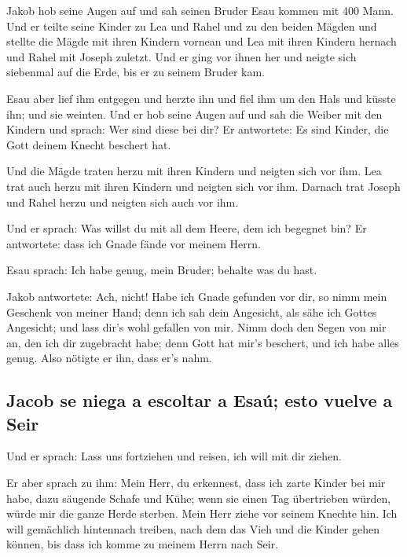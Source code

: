  Jakob hob seine Augen auf und sah seinen Bruder Esau
kommen mit 400 Mann. Und er teilte seine Kinder zu Lea und Rahel und zu
den beiden Mägden  und stellte die Mägde mit ihren Kindern
vornean und Lea mit ihren Kindern hernach und Rahel mit Joseph zuletzt.
 Und er ging vor ihnen her und neigte sich siebenmal auf
die Erde, bis er zu seinem Bruder kam.

 Esau aber lief ihm entgegen und herzte ihn und fiel ihm
um den Hals und küsste ihn; und sie weinten.  Und er hob
seine Augen auf und sah die Weiber mit den Kindern und sprach: Wer sind
diese bei dir? Er antwortete: Es sind Kinder, die Gott deinem Knecht
beschert hat.

 Und die Mägde traten herzu mit ihren Kindern und neigten
sich vor ihm.  Lea trat auch herzu mit ihren Kindern und
neigten sich vor ihm. Darnach trat Joseph und Rahel herzu und neigten
sich auch vor ihm.

 Und er sprach: Was willst du mit all dem Heere, dem ich
begegnet bin? Er antwortete: dass ich Gnade fände vor meinem Herrn.

 Esau sprach: Ich habe genug, mein Bruder; behalte was du
hast.

 Jakob antwortete: Ach, nicht! Habe ich Gnade gefunden
vor dir, so nimm mein Geschenk von meiner Hand; denn ich sah dein
Angesicht, als sähe ich Gottes Angesicht; und lass dir's wohl gefallen
von mir.  Nimm doch den Segen von mir an, den ich dir
zugebracht habe; denn Gott hat mir's beschert, und ich habe alles genug.
Also nötigte er ihn, dass er's nahm.

\hypertarget{jacob-se-niega-a-escoltar-a-esauxfa-esto-vuelve-a-seir}{%
\subsection{Jacob se niega a escoltar a Esaú; esto vuelve a
Seir}\label{jacob-se-niega-a-escoltar-a-esauxfa-esto-vuelve-a-seir}}

 Und er sprach: Lass uns fortziehen und reisen, ich will
mit dir ziehen.

 Er aber sprach zu ihm: Mein Herr, du erkennest, dass ich
zarte Kinder bei mir habe, dazu säugende Schafe und Kühe; wenn sie einen
Tag übertrieben würden, würde mir die ganze Herde sterben.
 Mein Herr ziehe vor seinem Knechte hin. Ich will
gemächlich hintennach treiben, nach dem das Vieh und die Kinder gehen
können, bis dass ich komme zu meinem Herrn nach Seir.

